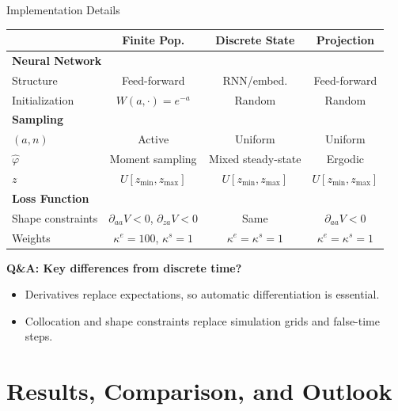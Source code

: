 \documentclass[aspectratio=169,11pt]{beamer}
\begin{document}
\begin{frame}{Implementation Details}
\scriptsize
\begin{center}
\renewcommand{\arraystretch}{1.0}
\begin{tabular}{lccc}
\toprule
& \textbf{Finite Pop.} & \textbf{Discrete State} & \textbf{Projection} \\
\midrule
\multicolumn{4}{l}{\textbf{Neural Network}} \\
\quad Structure & Feed-forward & RNN/embed. & Feed-forward \\
\quad Initialization & $W(a,\cdot) = e^{-a}$ & Random & Random \\
\multicolumn{4}{l}{\textbf{Sampling}} \\
\quad $(a, n)$ & Active & Uniform & Uniform \\
\quad $\hat{\varphi}$ & Moment sampling & Mixed steady-state & Ergodic \\
\quad $z$ & $U[z_{\min}, z_{\max}]$ & $U[z_{\min}, z_{\max}]$ & $U[z_{\min}, z_{\max}]$ \\
\multicolumn{4}{l}{\textbf{Loss Function}} \\
\quad Shape constraints & $\partial_{aa}V < 0$, $\partial_{za}V < 0$ & Same & $\partial_{aa}V < 0$ \\
\quad Weights & $\kappa^e = 100$, $\kappa^s = 1$ & $\kappa^e = \kappa^s = 1$ & $\kappa^e = \kappa^s = 1$ \\
\bottomrule
\end{tabular}
\end{center}

\vspace{0.05em}
\footnotesize
\textbf{Q\&A: Key differences from discrete time?}
\begin{itemize}\itemsep0pt
    \item Derivatives replace expectations, so automatic differentiation is essential.
    \item Collocation and shape constraints replace simulation grids and false-time steps.
\end{itemize}
\end{frame}


\section{Results, Comparison, and Outlook}
\end{document}

